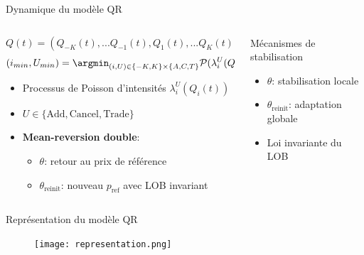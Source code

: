 \documentclass[aspectratio=169]{beamer}  %
\begin{document}
\begin{frame}{Dynamique du modèle QR}
    \begin{columns}
        \begin{column}{0.6\textwidth}
            \begin{equation*}
                Q(t) = (Q_{-K}(t),...Q_{-1}(t),Q_{1}(t),...Q_K(t))
            \end{equation*}
            \begin{equation*}
                (i_{min}, U_{min}) = \argmin_{(i,U)\in\{-K,K\}\times\{A,C,T\}} \mathcal{P}(\lambda_i^U(Q_i(t)))
            \end{equation*}
            \begin{itemize}
                \item Processus de Poisson d'intensités $\lambda_i^U(Q_i(t))$
                \item $U \in \{\text{Add}, \text{Cancel}, \text{Trade}\}$
                \item \textbf{Mean-reversion double}:
                \begin{itemize}
                    \item $\theta$: retour au prix de référence
                    \item $\theta_{\text{reinit}}$: nouveau $p_{\text{ref}}$ avec LOB invariant
                \end{itemize}
            \end{itemize}
        \end{column}
        \begin{column}{0.4\textwidth}
            \begin{alertblock}{Mécanismes de stabilisation}
                \begin{itemize}
                    \item $\theta$: stabilisation locale
                    \item $\theta_{\text{reinit}}$: adaptation globale
                    \item Loi invariante du LOB
                \end{itemize}
            \end{alertblock}
        \end{column}
    \end{columns}
\end{frame}

\begin{frame}{Représentation du modèle QR}
    \begin{figure}
        \centering
        \texttt{[image: representation.png]}
    \end{figure}
\end{frame}
\end{document}
